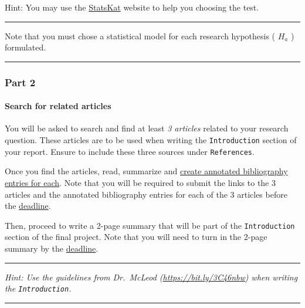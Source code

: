 \documentclass[
]{article}
\begin{document}
Hint: You may use the \href{https://statkat.com/index.php}{StatsKat} website to help you choosing the test.

\begin{center}\rule{0.5\linewidth}{0.5pt}\end{center}

Note that you must chose a statistical model for each research hypothesis ( \(H_a\) ) formulated.

\begin{center}\rule{0.5\linewidth}{0.5pt}\end{center}

\hypertarget{part-2}{%
\subsubsection{Part 2}\label{part-2}}

\hypertarget{articles}{%
\paragraph{Search for related articles}\label{articles}}

You will be asked to search and find at least \emph{3 articles} related to your research question. These articles are to be used when writing the \texttt{Introduction} section of your report. Ensure to include these three sources under \texttt{References}.

Once you find the articles, read, summarize and \href{https://bit.ly/2YIGK2t}{create annotated bibliography entries for each}. Note that you will be required to submit the links to the 3 articles and the annotated bibliography entries for each of the 3 articles before the \protect\hyperlink{deadlines}{deadline}.

Then, proceed to write a 2-page summary that will be part of the \texttt{Introduction} section of the final project. Note that you will need to turn in the 2-page summary by the \protect\hyperlink{deadlines}{deadline}.

\begin{center}\rule{0.5\linewidth}{0.5pt}\end{center}

\emph{Hint: Use the guidelines from Dr.~McLeod (\url{https://bit.ly/3C46nbw}) when writing the \texttt{Introduction}.}

\begin{center}\rule{0.5\linewidth}{0.5pt}\end{center}
\end{document}
